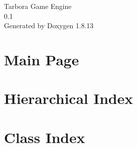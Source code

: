 \documentclass[twoside]{book}
\newcommand{\+}{\discretionary{\mbox{\scriptsize$\hookleftarrow$}}{}{}}
\newcommand{\clearemptydoublepage}{%
  \newpage{\pagestyle{empty}\cleardoublepage}%
}
\begin{document}
\hypersetup{pageanchor=false,
             bookmarksnumbered=true,
             pdfencoding=unicode
            }
\begin{titlepage}
\vspace*{7cm}
\begin{center}%
{\Large Tarbora Game Engine \\[1ex]\large 0.\+1 }\\
\vspace*{1cm}
{\large Generated by Doxygen 1.8.13}\\
\end{center}
\end{titlepage}
\clearemptydoublepage
{}
\tableofcontents
\clearemptydoublepage
{}
\hypersetup{pageanchor=true}

\chapter{Main Page}
\label{index}\hypertarget{index}{}
\chapter{Hierarchical Index}

\chapter{Class Index}

\end{document}

